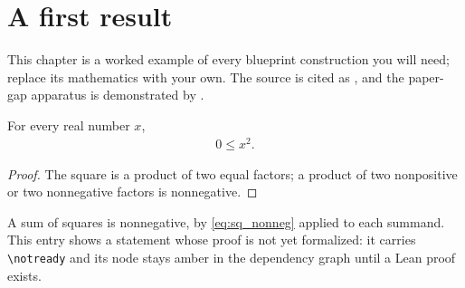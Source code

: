 \chapter{A first result}

This chapter is a worked example of every blueprint construction you will
need; replace its mathematics with your own. The source is cited as
\cite{Model2020}, and the paper-gap apparatus is demonstrated by
\cite{gap:demo_scope_restriction}.

\begin{theorem}
    \label{thm:sq_nonneg}
    \leanok
    For every real number \(x\),
    \begin{align}
        0 \le x^2. \label{eq:sq_nonneg}
    \end{align}
\end{theorem}
\begin{proof}\leanok
    The square is a product of two equal factors; a product of two
    nonpositive or two nonnegative factors is nonnegative.
\end{proof}

\begin{theorem}
    \label{thm:sum_sq_nonneg}
    \notready
    A sum of squares is nonnegative, by \eqref{eq:sq_nonneg} applied to each
    summand. This entry shows a statement whose proof is not yet
    formalized: it carries \verb|\notready| and its node stays amber in the
    dependency graph until a Lean proof exists.
\end{theorem}
